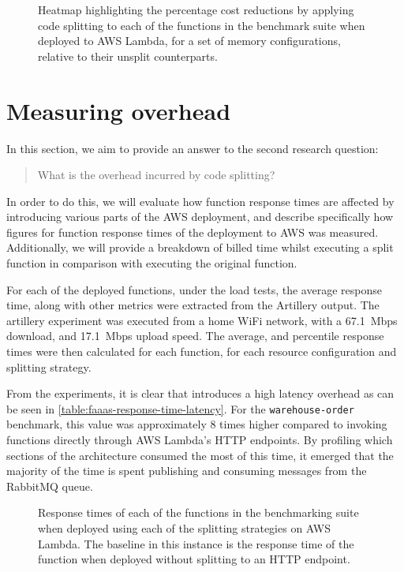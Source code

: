 \begin{figure*}
    \begin{center}
        
    \end{center}
    \caption{Heatmap highlighting the percentage cost reductions by applying code splitting to each of the functions in the benchmark suite when deployed to AWS Lambda, for a set of memory configurations, relative to their unsplit counterparts.}
    \label{fig:faaas-mem-prog-strat-heatmap-splitting-saving}
\end{figure*}

\section{Measuring \faaas{} overhead}
In this section, we aim to provide an answer to the second research question: \blockquote{What is the overhead incurred by code splitting?}. In order to do this, we will evaluate how function response times are affected by introducing various parts of the \faaas{} AWS deployment, and describe specifically how figures for function response times of the \faaas{} deployment to AWS was measured. Additionally, we will provide a breakdown of billed time whilst executing a \faaas{} split function in comparison with executing the original function.

For each of the deployed functions, under the load tests, the average response time, along with other metrics were extracted from the Artillery output. The artillery experiment was executed from a home WiFi network, with a \SI{67.1}{Mbps} download, and \SI{17.1}{Mbps} upload speed. The average, and percentile response times were then calculated for each function, for each resource configuration and splitting strategy.

From the experiments, it is clear that \faaas{} introduces a high latency overhead as can be seen in \ref{table:faaas-response-time-latency}. For the \verb|warehouse-order| benchmark, this value was approximately 8 times higher compared to invoking functions directly through AWS Lambda's HTTP endpoints. By profiling which sections of the architecture consumed the most of this time, it emerged that the majority of the time is spent publishing and consuming messages from the RabbitMQ queue.

\begin{figure}
    \begin{center}
        
    \end{center}
    \caption{Response times of each of the functions in the benchmarking suite when deployed using each of the splitting strategies on AWS Lambda. The baseline in this instance is the response time of the function when deployed without splitting to an HTTP endpoint.}
\end{figure}

